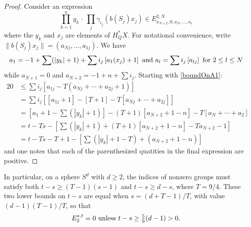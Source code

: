 \documentclass[10pt]{article}
\begin{document}
\begin{VanishingLines}
\begin{proof}
Consider an expression 
\[\prod_{k=1}^ny_k\,\cdot\,\prod_j\gamma_{i_j}(b(S_j)x_j)\in E^{2,N}_{a_{N+2},0,a_N,\ldots,a_1}\]
where the $y_k$ and $x_j$ are elements of $H^*_QX$. For notational convenience, write $\|b(S_j)x_j\|=(a_{Nj},\ldots,a_{1j})$. We have
\[a_1=-1+\sum(|y_k|+1)+\sum i_j\left[a_1(x_j)+1\right]\textup{ and }a_l=\sum i_j\left[a_{lj}\right]\textup{ for $2\leq l\leq N$}\]
while $a_{N+1}=0$ and $a_{N+2}=-1+n+\sum i_j$. Starting with \ref{boundOnA1}:
\begin{alignat*}{2}
0
&\leq
\sum i_j\left[a_{1j}-T(a_{Nj}+\cdots +a_{2j}+1)\right]%
\\
&=
\sum i_j\left[[a_{1j}+1]-[T+1]-T[a_{Nj}+\cdots +a_{2j}]\right]%
\\
&=
[a_1+1-\sum(|y_k|+1)]-(T+1)[a_{N+2}+1-n]-T[a_N+\cdots +a_2]\\%
&=t-Ts-\left[\sum(|y_k|+1)+(T+1)[a_{N+2}+1-n]-Ta_{N+2}-1\right]\\%
&=t-Ts-T+1-\left[\sum(|y_k|+1-T)+(a_{N+2}+1-n)\right]
\end{alignat*}
and one notes that each of the parenthesized quatities in the final expression are positive.
\end{proof}

In particular, on a sphere $S^d$ with $d\geq2$, the indices of nonzero groups must satisfy both $t-s\geq(T-1)(s-1)$ and $t-s\geq d-s$, where $T=9/4$. These two lower bounds on $t-s$ are equal when $s=(d+T-1)/T$, with value $(d-1)(T-1)/T$, so that
\[E_2^{s,t}=0\textup{\ unless $t-s\geq \tfrac{5}{9}(d-1)>0$.}\]

\end{VanishingLines}
\end{document}
